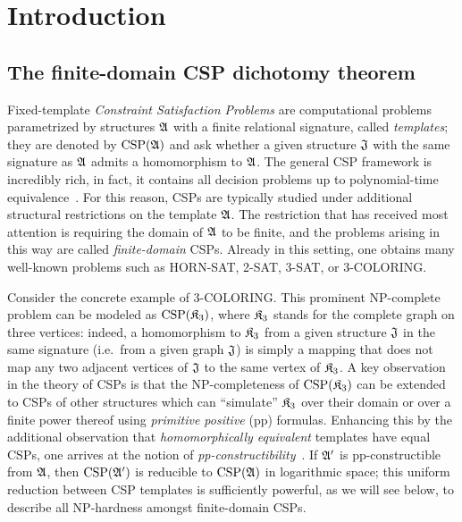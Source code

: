 \section{Introduction}\label{section:introduction}  
 

 \subsection{The finite-domain CSP dichotomy theorem} 
%
 Fixed-template  \emph{Constraint Satisfaction Problems} are computational problems parametrized by  structures $\mathfrak{A}$ with a finite relational signature, called \emph{templates}; they are denoted by $\mathrm{CSP}(\mathfrak{A})$ and ask whether a given structure $\mathfrak{J}$ with the same signature as $\mathfrak{A}$ admits a homomorphism to $\mathfrak{A}$. 
The general CSP framework is incredibly rich, in fact, it contains all decision problems up to polynomial-time equivalence~\cite{bodirsky2008non}.
%
For this reason, CSPs are typically studied under additional structural restrictions on the template $\mathfrak{A}$.
%
The restriction that has received most attention is requiring the domain of $\mathfrak{A}$ to be finite, and the problems arising in this way are called \emph{finite-domain} CSPs.
%
Already in this setting, one obtains many well-known problems such as HORN-SAT, 2-SAT, 3-SAT, or 3-COLORING.

Consider the concrete example of 3-COLORING. This prominent  
 NP-complete problem can be modeled as $\mathrm{CSP}(\mathfrak{K}_3)$, where $\mathfrak{K}_3$ stands for the complete graph on three vertices: indeed, a homomorphism to $\mathfrak{K}_3$ from a given structure $\mathfrak{J}$ in the same signature (i.e.~from a given graph $\mathfrak{J}$) is simply a  mapping that does not map any  two adjacent vertices of $\mathfrak{J}$ to the same vertex of $\mathfrak{K}_3$.
% 
A key observation in the theory of CSPs is that the NP-completeness of $\mathrm{CSP}(\mathfrak{K}_3)$ can be extended to CSPs of other structures which can ``simulate'' $\mathfrak{K}_3$ over their domain or over a finite power thereof using \emph{primitive positive} (pp) formulas.
%  
Enhancing this by the additional observation that \emph{homomorphically equivalent}  templates have equal CSPs, one arrives at the notion of \emph{pp-constructibility}~\cite{barto2018wonderland}.  
%
If $\mathfrak{A'}$ is pp-constructible from $\mathfrak{A}$, then $\mathrm{CSP}(\mathfrak{A'})$ is reducible to $\mathrm{CSP}(\mathfrak{A})$ in logarithmic space; this uniform  reduction between CSP templates is sufficiently powerful, as we will see below, to describe all NP-hardness amongst finite-domain CSPs.


